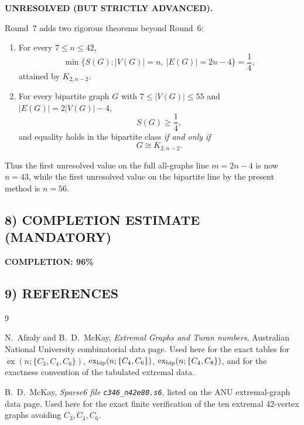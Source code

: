\textbf{UNRESOLVED (BUT STRICTLY ADVANCED).}

Round~7 adds two rigorous theorems beyond Round~6:

\begin{enumerate}
\item For every $7\le n\le 42$,
\[
\min\{S(G): |V(G)|=n,\ |E(G)|=2n-4\}=\frac14,
\]
attained by $K_{2,n-2}$.

\item For every bipartite graph $G$ with $7\le |V(G)|\le 55$ and $|E(G)|=2|V(G)|-4$,
\[
S(G)\ge \frac14,
\]
and equality holds in the bipartite class \emph{if and only if}
\[
G\cong K_{2,n-2}.
\]
\end{enumerate}

Thus the first unresolved value on the full all-graphs line $m=2n-4$ is now $n=43$, while the first unresolved value on the bipartite line by the present method is $n=56$.

\subsection*{8) COMPLETION ESTIMATE (MANDATORY)}

\textbf{COMPLETION: 96\%}

\subsection*{9) REFERENCES}

\begin{thebibliography}{9}

N.~Afzaly and B.~D.~McKay,
\emph{Extremal Graphs and Turan numbers},
Australian National University combinatorial data page.
Used here for the exact tables for
$\operatorname{ex}(n;\{C_3,C_4,C_6\})$,
$\operatorname{ex}_{\rm bip}(n;\{C_4,C_6\})$,
$\operatorname{ex}_{\rm bip}(n;\{C_4,C_8\})$,
and for the exactness convention of the tabulated extremal data.

B.~D.~McKay,
\emph{Sparse6 file \texttt{c346\_n42e80.s6}},
listed on the ANU extremal-graph data page.
Used here for the exact finite verification of the ten extremal $42$-vertex graphs avoiding $C_3,C_4,C_6$.

\end{thebibliography}
